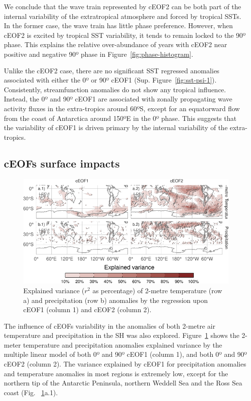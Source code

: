 \documentclass[pdflatex,lineno,sn-basic]{sn-jnl}
\theoremstyle{thmstyleone}%
\theoremstyle{thmstyletwo}%
\theoremstyle{thmstylethree}%
\begin{document}
We conclude that the wave train represented by cEOF2 can be both part of the internal variability of the extratropical atmosphere and forced by tropical SSTs.
In the former case, the wave train has little phase preference.
However, when cEOF2 is excited by tropical SST variability, it tends to remain locked to the 90º phase.
This explains the relative over-abundance of years with cEOF2 near positive and negative 90º phase in Figure~\ref{fig:phase-histogram}.

Unlike the cEOF2 case, there are no significant SST regressed anomalies associated with either the 0º or 90º cEOF1 (Sup. Figure~\ref{fig:sst-psi-1}).
Consistently, streamfunction anomalies do not show any tropical influence.
Instead, the 0º and 90º cEOF1 are associated with zonally propagating wave activity fluxes in the extra-tropics around 60ºS, except for an equatorward flow from the coast of Antarctica around 150ºE in the 0º phase.
This suggests that the variability of cEOF1 is driven primary by the internal variability of the extra-tropics.

\hypertarget{precipitation}{%
\subsection{cEOFs surface impacts}\label{precipitation}}

\begin{figure}
\centering
\includegraphics{shceof_files/figure-latex/pp-t2m-r2-1.pdf}
\caption{\label{fig:pp-t2m-r2}Explained variance (\(r^2\) as percentage) of 2-metre temperature (row a) and precipitation (row b) anomalies by the regression upon cEOF1 (column 1) and cEOF2 (column 2).}
\end{figure}



The influence of cEOFs variability in the anomalies of both 2-metre air temperature and precipitation in the SH was also explored.
Figure~\ref{fig:pp-t2m-r2} shows the 2-meter temperature and precipitation anomalies explained variance by the multiple linear model of both 0º and 90º cEOF1 (column 1), and both 0º and 90º cEOF2 (column 2).
The variance explained by cEOF1 for precipitation anomalies and temperature anomalies in most regions is extremely low, except for the northern tip of the Antarctic Peninsula, northern Weddell Sea and the Ross Sea coast (Fig.~ \ref{fig:pp-t2m-r2}a.1).
\end{document}
